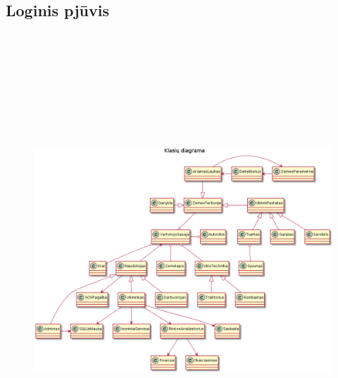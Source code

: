 \documentclass[oneside]{VUMIFPSkursinis}
\begin{document}
\subsection{Loginis pjūvis}
			\begin{figure}[H]
		\centering	
\includegraphics[width=15cm,height=17cm,keepaspectratio]{Klasesv2.png}
	\caption{}
	\label{fig:Klasesv2}
\end{figure}
	
\end{document}
